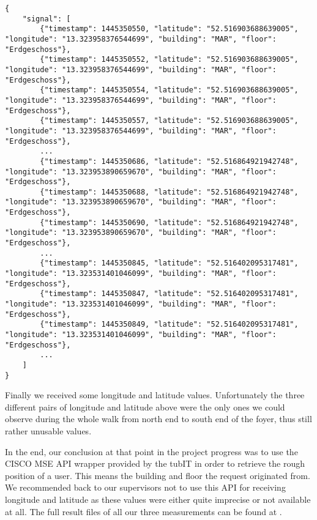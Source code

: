 \begin{lstlisting}
{
    "signal": [
        {"timestamp": 1445350550, "latitude": "52.516903688639005", "longitude": "13.323958376544699", "building": "MAR", "floor": "Erdgeschoss"},
        {"timestamp": 1445350552, "latitude": "52.516903688639005", "longitude": "13.323958376544699", "building": "MAR", "floor": "Erdgeschoss"},
        {"timestamp": 1445350554, "latitude": "52.516903688639005", "longitude": "13.323958376544699", "building": "MAR", "floor": "Erdgeschoss"},
        {"timestamp": 1445350557, "latitude": "52.516903688639005", "longitude": "13.323958376544699", "building": "MAR", "floor": "Erdgeschoss"},
        ...
        {"timestamp": 1445350686, "latitude": "52.516864921942748", "longitude": "13.323953890659670", "building": "MAR", "floor": "Erdgeschoss"},
        {"timestamp": 1445350688, "latitude": "52.516864921942748", "longitude": "13.323953890659670", "building": "MAR", "floor": "Erdgeschoss"},
        {"timestamp": 1445350690, "latitude": "52.516864921942748", "longitude": "13.323953890659670", "building": "MAR", "floor": "Erdgeschoss"},
        ...
        {"timestamp": 1445350845, "latitude": "52.516402095317481", "longitude": "13.323531401046099", "building": "MAR", "floor": "Erdgeschoss"},
        {"timestamp": 1445350847, "latitude": "52.516402095317481", "longitude": "13.323531401046099", "building": "MAR", "floor": "Erdgeschoss"},
        {"timestamp": 1445350849, "latitude": "52.516402095317481", "longitude": "13.323531401046099", "building": "MAR", "floor": "Erdgeschoss"},
        ...
    ]
}
\end{lstlisting}

Finally we received some longitude and latitude values. Unfortunately the three different pairs of longitude and latitude above were the only ones we could observe during the whole walk from north end to south end of the foyer, thus still rather unusable values.

In the end, our conclusion at that point in the project progress was to use the CISCO MSE API wrapper provided by the tubIT in order to retrieve the rough position of a user. This means the building and floor the request originated from. We recommended back to our supervisors not to use this API for receiving longitude and latitude as these values were either quite imprecise or not available at all. The full result files of all our three measurements can be found at \cite{ioslINavGitHub}.


\vspace{0.5cm}

